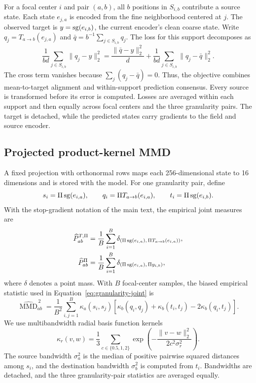 For a focal center $i$ and pair $(a,b)$, all $b$ positions in $S_{i,b}$ contribute a source state. Each state $e_{j,a}$ is encoded from the fine neighborhood centered at $j$. The observed target is $y=\operatorname{sg}(e_{i,b})$, the current encoder's clean coarse state. Write $q_j=T_{a\to b}(e_{j,a})$ and $\bar q=b^{-1}\sum_{j\in S_{i,b}}q_j$. The loss for this support decomposes as
\begin{equation}
\frac{1}{bd}\sum_{j\in S_{i,b}}\|q_j-y\|_2^2
=\frac{\|\bar q-y\|_2^2}{d}
+\frac{1}{bd}\sum_{j\in S_{i,b}}\|q_j-\bar q\|_2^2.
\label{eq:consensus-decomposition}
\end{equation}
The cross term vanishes because $\sum_j(q_j-\bar q)=0$. Thus, the objective combines mean-to-target alignment and within-support prediction consensus. Every source is transformed before its error is computed. Losses are averaged within each support and then equally across focal centers and the three granularity pairs. The target is detached, while the predicted states carry gradients to the field and source encoder.

\subsection{Projected product-kernel MMD}

A fixed projection with orthonormal rows maps each 256-dimensional state to 16 dimensions and is stored with the model. For one granularity pair, define
\begin{equation}
s_i=\Pi\operatorname{sg}(e_{i,a}),\qquad
q_i=\Pi T_{a\to b}(e_{i,a}),\qquad
t_i=\Pi\operatorname{sg}(e_{i,b}).
\end{equation}
With the stop-gradient notation of the main text, the empirical joint measures are
\begin{equation}
\begin{aligned}
\widehat P_{ab}^{T,\Pi}
&=\frac{1}{B}\sum_{i=1}^{B}
\delta_{(\Pi\operatorname{sg}(e_{i,a}),\,\Pi T_{a\to b}(e_{i,a}))},\\
\widehat P_{ab}^{\Pi}
&=\frac{1}{B}\sum_{i=1}^{B}
\delta_{(\Pi\operatorname{sg}(e_{i,a}),\,\Pi y_{i,b})},
\end{aligned}
\label{eq:projected-joint-measures}
\end{equation}
where $\delta$ denotes a point mass. With $B$ focal-center samples, the biased empirical statistic used in Equation~\ref{eq:granularity-joint} is
\begin{equation}
\widehat{\operatorname{MMD}}_{ab}^{\,2}
=\frac{1}{B^2}\sum_{i,j=1}^{B}
\kappa_a(s_i,s_j)
\left[\kappa_b(q_i,q_j)+\kappa_b(t_i,t_j)
-2\kappa_b(q_i,t_j)\right].
\label{eq:empirical-joint-mmd}
\end{equation}
We use multibandwidth radial basis function kernels
\begin{equation}
\kappa_r(v,w)
=\frac{1}{3}\sum_{c\in\{0.5,1,2\}}
\exp\!\left(-\frac{\|v-w\|_2^2}{2 c^2\sigma_r^2}\right).
\label{eq:multibandwidth-rbf}
\end{equation}
The source bandwidth $\sigma_a^2$ is the median of positive pairwise squared distances among $s_i$, and the destination bandwidth $\sigma_b^2$ is computed from $t_i$. Bandwidths are detached, and the three granularity-pair statistics are averaged equally.

